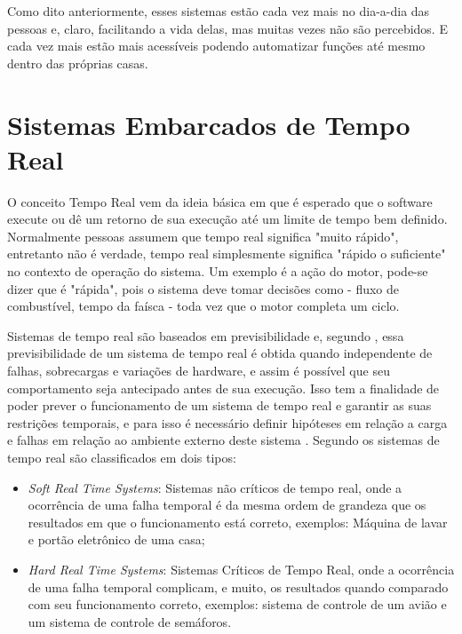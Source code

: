 Como dito anteriormente, esses sistemas estão cada vez mais no dia-a-dia das pessoas e, claro, facilitando a vida delas, mas muitas vezes não são percebidos. E cada vez mais estão mais acessíveis podendo automatizar funções até mesmo dentro das próprias casas. %


\section{Sistemas Embarcados de Tempo Real}
\label{sec:sis_embarcados_tempo_real}
O conceito Tempo Real vem da ideia básica em que é esperado que o software execute ou dê um retorno de sua execução até um limite de tempo bem definido. Normalmente pessoas assumem que tempo real significa "muito rápido", entretanto não é verdade, tempo real simplesmente significa "rápido o suficiente" no contexto de operação do sistema. Um exemplo é a ação do motor, pode-se dizer que é "rápida", pois o sistema deve tomar decisões como - fluxo de combustível, tempo da faísca - toda vez que o motor completa um ciclo.

Sistemas de tempo real são baseados em previsibilidade e, segundo \cite{farines2000sistemas}, essa previsibilidade de um sistema de tempo real é obtida quando independente de falhas, sobrecargas e variações de hardware, e assim é possível que seu comportamento seja antecipado antes de sua execução. Isso tem a finalidade de poder prever o funcionamento de um sistema de tempo real e garantir as suas restrições temporais, e para isso é necessário definir hipóteses em relação a carga e falhas em relação ao ambiente externo deste sistema \cite{farines2000sistemas}. 
Segundo \cite{mall2009real} os sistemas de tempo real são classificados em dois tipos:
\begin{itemize}
\item \emph{Soft Real Time Systems}: Sistemas não críticos de tempo real, onde a ocorrência de uma falha temporal é da mesma ordem de grandeza que os resultados em que o funcionamento está correto, exemplos: Máquina de lavar e portão eletrônico de uma casa;
\item \emph{Hard Real Time Systems}: Sistemas Críticos de Tempo Real, onde a ocorrência de uma falha temporal complicam, e muito, os resultados quando comparado com seu funcionamento correto, exemplos: sistema de controle de um avião e um sistema de controle de semáforos.
\end{itemize}


